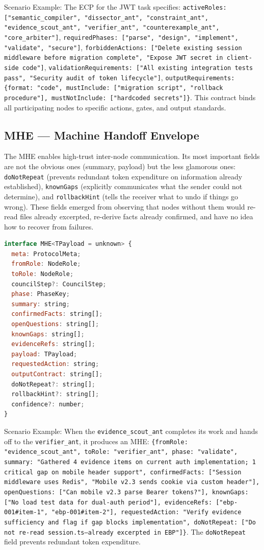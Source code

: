 \documentclass[12pt,a4paper]{article}
\begin{document}
Scenario Example: The ECP for the JWT task specifies: \texttt{activeRoles: ["semantic\_compiler", "dissector\_ant", "constraint\_ant", "evidence\_scout\_ant", "verifier\_ant", "counterexample\_ant", "core\_arbiter"]}, \texttt{requiredPhases: ["parse", "design", "implement", "validate", "secure"]}, \texttt{forbiddenActions: ["Delete existing session middleware before migration complete", "Expose JWT secret in client-side code"]}, \texttt{validationRequirements: ["All existing integration tests pass", "Security audit of token lifecycle"]}, \texttt{outputRequirements: \{format: "code", mustInclude: ["migration script", "rollback procedure"], mustNotInclude: ["hardcoded secrets"]\}}. This contract binds all participating nodes to specific actions, gates, and output standards.

\subsection{MHE --- Machine Handoff Envelope}


The MHE enables high-trust inter-node communication. Its most important fields are not the obvious ones (summary, payload) but the less glamorous ones: \texttt{doNotRepeat} (prevents redundant token expenditure on information already established), \texttt{knownGaps} (explicitly communicates what the sender could not determine), and \texttt{rollbackHint} (tells the receiver what to undo if things go wrong). These fields emerged from observing that nodes without them would re-read files already excerpted, re-derive facts already confirmed, and have no idea how to recover from failures.

\begin{lstlisting}[language=JavaScript]
interface MHE<TPayload = unknown> {
  meta: ProtocolMeta;
  fromRole: NodeRole;
  toRole: NodeRole;
  councilStep?: CouncilStep;
  phase: PhaseKey;
  summary: string;
  confirmedFacts: string[];
  openQuestions: string[];
  knownGaps: string[];
  evidenceRefs: string[];
  payload: TPayload;
  requestedAction: string;
  outputContract: string[];
  doNotRepeat?: string[];
  rollbackHint?: string[];
  confidence?: number;
}
\end{lstlisting}


Scenario Example: When the \texttt{evidence\_scout\_ant} completes its work and hands off to the \texttt{verifier\_ant}, it produces an MHE: \texttt{\{fromRole: "evidence\_scout\_ant", toRole: "verifier\_ant", phase: "validate", summary: "Gathered 4 evidence items on current auth implementation; 1 critical gap on mobile header support", confirmedFacts: ["Session middleware uses Redis", "Mobile v2.3 sends cookie via custom header"], openQuestions: ["Can mobile v2.3 parse Bearer tokens?"], knownGaps: ["No load test data for dual-auth period"], evidenceRefs: ["ebp-001\#item-1", "ebp-001\#item-2"], requestedAction: "Verify evidence sufficiency and flag if gap blocks implementation", doNotRepeat: ["Do not re-read session.ts—already excerpted in EBP"]\}}. The \texttt{doNotRepeat} field prevents redundant token expenditure.
\end{document}

